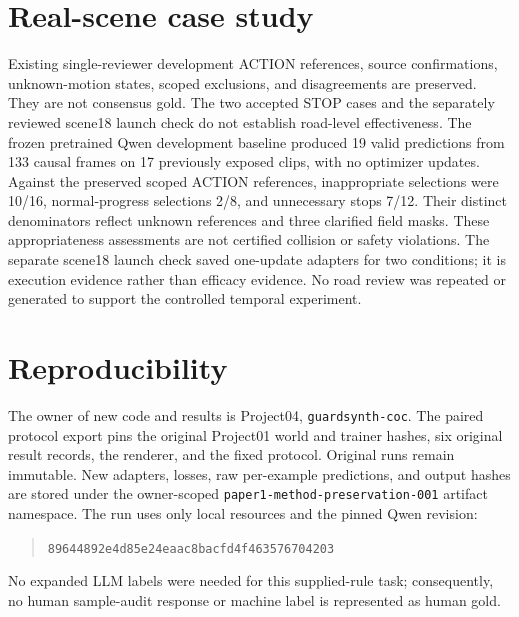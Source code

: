 \documentclass[11pt]{article}
\begin{document}
\section{Real-scene case study}
Existing single-reviewer development ACTION references, source confirmations,
unknown-motion states, scoped exclusions, and disagreements are preserved.
They are not consensus gold. The two accepted STOP cases and the separately
reviewed scene18 launch check do not establish road-level effectiveness.
The frozen pretrained Qwen development baseline produced 19 valid predictions
from 133 causal frames on 17 previously exposed clips, with no optimizer updates.
Against the preserved scoped ACTION references, inappropriate selections were
10/16, normal-progress selections 2/8, and unnecessary stops 7/12. Their distinct
denominators reflect unknown references and three clarified field masks. These
appropriateness assessments are not certified collision or safety violations.
The separate scene18 launch check saved one-update adapters for two conditions;
it is execution evidence rather than efficacy evidence. No road review was
repeated or generated to support the controlled temporal experiment.
\section{Reproducibility}
The owner of new code and results is Project04, \texttt{guardsynth-coc}.
The paired protocol export pins the original Project01 world and trainer hashes,
six original result records, the renderer, and the fixed protocol. Original runs
remain immutable. New adapters, losses, raw per-example predictions, and output
hashes are stored under the owner-scoped \texttt{paper1-method-preservation-001}
artifact namespace. The run uses only local resources and the pinned Qwen
revision:
\begin{quote}\small\texttt{89644892e4d85e24eaac8bacfd4f463576704203}\end{quote}
No expanded LLM labels were needed for this supplied-rule task; consequently,
no human sample-audit response or machine label is represented as human gold.
\end{document}
